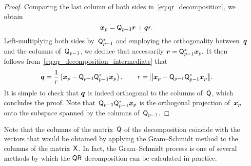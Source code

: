 \begin{proof}
    Comparing the last column of both sides in~\eqref{eq:qr_decomposition},
    we obtain
    \begin{equation}
        \label{eq:qr_decomposition_intermediate}
        \mathbf{\boldsymbol{x}}_p = \mathsf Q_{p-1} \mathbf{\boldsymbol{r}} + \mathbf{\boldsymbol{q}} r.
    \end{equation}
    Left-multiplying both sides by~$\mathsf Q_{p-1}^*$ and employing the orthogonality between~$\mathbf{\boldsymbol{q}}$ and the columns of~$\mathsf Q_{p-1}$,
    we deduce that necessarily
    \(
        \mathbf{\boldsymbol{r}} = \mathsf Q_{p-1}^* \mathbf{\boldsymbol{x}}_p.
    \)
    It then follows from~\eqref{eq:qr_decomposition_intermediate} that
    \[
        \vect q = \frac{1}{r} \left(\vect x_p - \mat Q_{p-1} \mat Q_{p-1}^* \vect x_p\right), \qquad
        r = \norm*{\vect x_p -  \mat Q_{p-1} \mat Q_{p-1}^* \vect x_p}.
    \]
    It is simple to check that $\mathbf{\boldsymbol{q}}$ is indeed orthogonal to the columns of~$\mathsf Q$,
    which concludes the proof.
    Note that~$\mathsf Q_{p-1} \mathsf Q_{p-1}^* \mathbf{\boldsymbol{x}}_p$ is the orthogonal projection of~$\mathbf{\boldsymbol{x}}_p$ onto the subspace spanned by the columns of~$\mathsf Q_{p-1}$.
\end{proof}
Note that the columns of the matrix~$\mathsf Q$ of the decomposition coincide with the vectors that
would be obtained by applying the Gram--Schmidt method to the columns of the matrix~$\mathsf X$.
In fact, the Gram--Schmidt process is one of several methods by which the $\mathsf Q \mathsf R$ decomposition can be calculated in practice.

